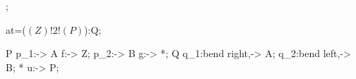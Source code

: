 \startkD

;

\obj at=($(Z)!2!(P)$):Q;

\mor[swap] P p_1:-> A f:-> Z;
\mor       * p_2:-> B g:-> *;
\mor[swap] Q q_1:{bend right},-> A;
\mor       * q_2:{bend left},-> B;
 * u:-> P;

\stopkD
